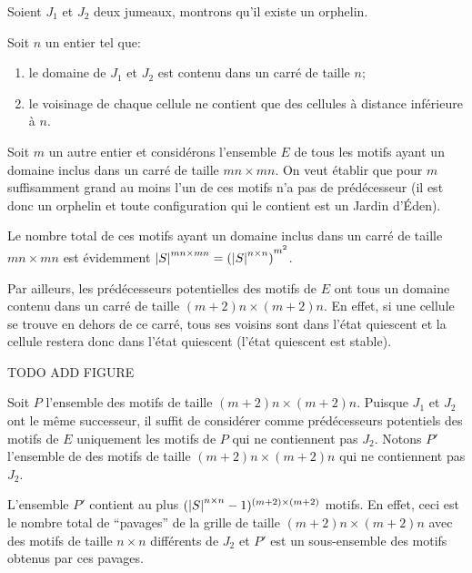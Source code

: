 \begin{proofI}
\begin{itemize}
		      Soient $J_1$ et $J_2$ deux jumeaux, montrons qu'il existe un orphelin.

		      Soit $n$ un entier tel que:
		      \begin{enumerate}
			      \item le domaine de $J_1$ et $J_2$ est contenu dans un carré de taille $n$;
			      \item le voisinage de chaque cellule ne contient que des cellules à distance inférieure à $n$.
		      \end{enumerate}
		      Soit $m$ un autre entier et considérons l'ensemble $E$ de tous les motifs ayant un domaine inclus
		      dans un carré de taille $mn \times mn$.
		      On veut établir que pour $m$ suffisamment grand au moins l'un de ces motifs n'a pas
		      de prédécesseur (il est donc un orphelin et toute
		      configuration qui le contient est un Jardin d'\'Eden).

		      Le nombre total de ces motifs ayant un domaine inclus
		      dans un carré de taille $mn \times mn$ est évidemment $\left|S\right|  ^{mn \times mn}= {(\left|S\right|  ^{n \times n})}^{m^2}$.

		      Par ailleurs, les prédécesseurs potentielles des motifs de $E$ ont tous un domaine contenu dans
		      un carré de taille $(m+2)n \times (m+2)n$.
		      En effet, si une cellule se trouve en dehors de ce carré, tous ses voisins sont dans l'état quiescent et la cellule
		      restera donc dans l'état quiescent (l'état quiescent est stable).

		      TODO ADD FIGURE

		      Soit $P$ l'ensemble des motifs de taille $(m+2)n \times (m+2)n$. Puisque  $J_1$ et $J_2$  ont
		      le même successeur, il suffit de considérer comme prédécesseurs potentiels
		      des motifs de $E$ uniquement les motifs de $P$ qui ne contiennent pas $J_2$.
		      Notons $P'$ l'ensemble de  des motifs de taille $(m+2)n \times (m+2)n$ qui ne contiennent pas $J_2$.

		      L'ensemble $P'$ contient au plus $(\left|S\right| ^{n \times n}-1)^{(m + 2) \times (m + 2)}$ motifs.
		      En effet, ceci est le nombre total de ``pavages'' de la grille de taille $(m+2)n \times (m+2)n$ avec des motifs
		      de taille $n \times n$ différents de $J_2$ et $P'$ est un sous-ensemble des motifs obtenus par ces pavages.


\end{itemize}
\end{proofI}
